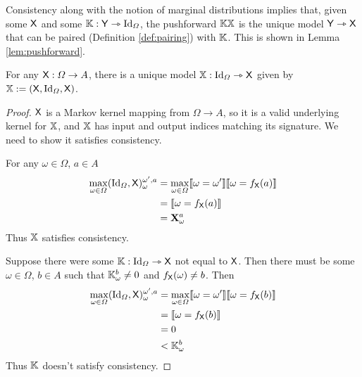 Consistency along with the notion of marginal distributions implies that, given some $\mathsf{X}$ and some $\mathbb{K}:\mathsf{Y}\rightarrowtriangle\text{Id}_\Omega$, the pushforward $\mathbb{K}\mathbb{X}$ is the unique model $\mathsf{Y}\rightarrowtriangle \mathsf{X}$ that can be paired (Definition \ref{def:pairing}) with $\mathbb{K}$. This is shown in Lemma \ref{lem:pushforward}.

\begin{lemma}\label{lem:uniq_model}
For any $\mathsf{X}:\Omega\to A$, there is a unique model $\mathbb{X}:\text{Id}_\Omega\rightarrowtriangle \mathsf{X}$ given by $\mathbb{X}:=(\mathsf{X},\text{Id}_\Omega,\mathsf{X})$.
\end{lemma}

\begin{proof}
$\mathsf{X}$ is a Markov kernel mapping from $\Omega\to A$, so it is a valid underlying kernel for $\mathbb{X}$, and $\mathbb{X}$ has input and output indices matching its signature. We need to show it satisfies consistency.

For any $\omega\in \Omega$, $a\in A$
\begin{align}
	\max_{\omega\in \Omega}(\text{Id}_\Omega,\mathsf{X})_{\omega}^{\omega',a} &= \max_{\omega\in \Omega} \llbracket \omega = \omega' \rrbracket \llbracket \omega = f_{\mathsf{X}}(a) \rrbracket\\
	&= \llbracket \omega = f_{\mathsf{X}}(a) \rrbracket\\
	&= \mathbf{X}_\omega^a
\end{align}
Thus $\mathbb{X}$ satisfies consistency.

Suppose there were some $\mathbb{K}:\text{Id}_\Omega\rightarrowtriangle \mathsf{X}$ not equal to $\mathsf{X}$. Then there must be some $\omega\in \Omega$, $b\in A$ such that $\mathbb{K}_\omega^b\neq 0$ and $f_{\mathsf{X}}(\omega)\neq b$. Then
\begin{align}
	\max_{\omega\in \Omega}(\text{Id}_\Omega,\mathsf{X})_{\omega}^{\omega',a} &= \max_{\omega\in \Omega} \llbracket \omega = \omega' \rrbracket \llbracket \omega = f_{\mathsf{X}}(b) \rrbracket\\
	&= \llbracket \omega = f_{\mathsf{X}}(b) \rrbracket\\
	&= 0\\
	&< \mathbb{K}_\omega^b
\end{align}
Thus $\mathbb{K}$ doesn't satisfy consistency.
\end{proof}


